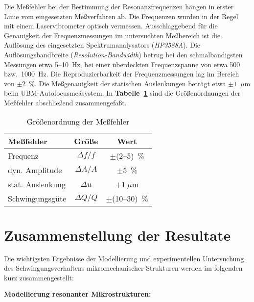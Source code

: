 Die Meßfehler bei der Bestimmung der Resonanzfrequenzen hängen in erster
Linie vom eingesetzten Meßverfahren ab. Die Frequenzen wurden in der Regel
mit einem Laservibrometer optisch vermessen. Ausschlaggebend für die
Genauigkeit der Frequenzmessungen im untersuchten Meßbereich ist die
Auflösung des eingesetzten Spektrumanalysators ({\sl HP3588A}).
Die Auflösungsbandbreite ({\em Resolution-Bandwidth}) betrug bei den
schmalbandigsten Messungen etwa 5--10~Hz, bei einer
überdeckten Frequenzspanne von etwa 500 bzw.\ 1000~Hz.
Die Reproduzierbarkeit der Frequenzmessungen lag im Bereich von
$\pm$2~\%.
Die Meßgenauigkeit der statischen Auslenkungen beträgt etwa
$\pm1$~$\mu$m beim UBM-Autofocusmeásystem.
In {\bf Tabelle~\ref{tabmessfehler}} sind die
Größenordnungen der Meßfehler ab\-schließend zusammengefaßt.
\begin{table}[htb]
\caption{\label{tabmessfehler}
 Größenordnung der Meßfehler}
\begin{center}
\begin{tabular}{|l||c|c|}
\hline
  Meßfehler  &  Größe   &  Wert  \\
\hline \hline
Frequenz          &  $\Delta f/f$   &  $\pm$(2--5)~\%   \\
dyn. Amplitude    &  $\Delta A/A$   &  $\pm5$~\%      \\
stat. Auslenkung  &  $\Delta u$     &  $\pm1~\mu$m    \\
Schwingungsgüte   &  $\Delta Q/Q$   &  $\pm$(10--30)~\% \\
\hline
\end{tabular}
\end{center}
\end{table}



\newpage
\section{Zusammenstellung der Resultate}
\label{resultateschwingungsverhalten}

Die wichtigsten Ergebnisse der Modellierung und experimentellen Untersuchung
des Schwingungsverhaltens mikromechanischer Strukturen werden im folgenden
kurz zusammengestellt:


{\bf Modellierung resonanter Mikrostrukturen:}


